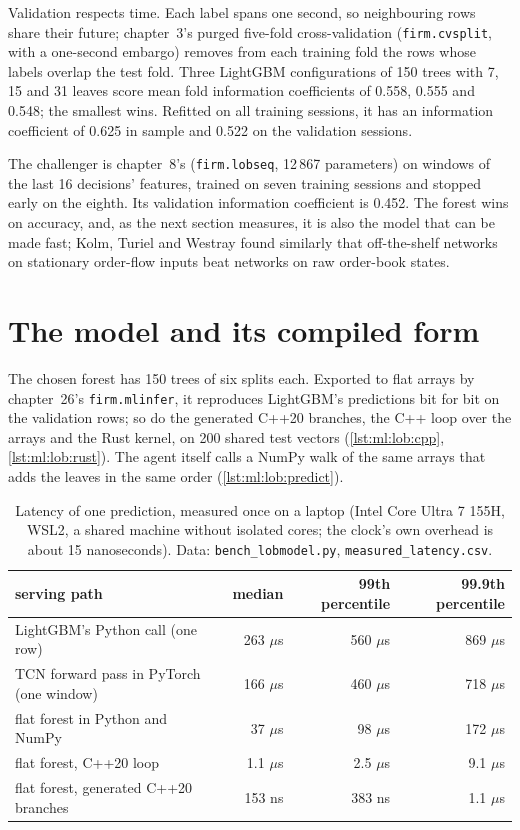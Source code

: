 Validation respects time. Each label spans one second, so neighbouring rows share their future; chapter~3's purged five-fold
cross-validation (\texttt{firm.cvsplit}, with a one-second embargo) removes from each training fold the rows whose labels overlap
the test fold. Three LightGBM configurations of 150 trees with 7, 15 and 31 leaves score mean fold information coefficients of
0.558, 0.555 and 0.548; the smallest wins. Refitted on all training sessions, it has an information coefficient of 0.625 in sample
and 0.522 on the validation sessions.

The challenger is chapter~8's  (\texttt{firm.lobseq}, 12\,867 parameters) on windows of the last 16
decisions' features, trained on seven training sessions and stopped early on the eighth. Its validation information coefficient is
0.452. The forest wins on accuracy, and, as the next section measures, it is also the model that can be made fast; Kolm, Turiel and
Westray found similarly that off-the-shelf networks on stationary order-flow inputs beat networks on raw order-book states.

\section{The model and its compiled form}

The chosen forest has 150 trees of six splits each. Exported to flat arrays by chapter~26's \texttt{firm.mlinfer}, it reproduces
LightGBM's predictions bit for bit on the validation rows; so do the generated C++20 branches, the C++ loop over the arrays and the
Rust kernel, on 200 shared test vectors (\cref{lst:ml:lob:cpp}, \cref{lst:ml:lob:rust}). The agent itself calls a NumPy walk of the
same arrays that adds the leaves in the same order (\cref{lst:ml:lob:predict}).

\begin{table}[htbp]
\centering\small
\begin{tabular}{@{}lrrr@{}}
\toprule
serving path & median & 99th percentile & 99.9th percentile\\
\midrule
LightGBM's Python call (one row) & 263 $\mu$s & 560 $\mu$s & 869 $\mu$s\\
TCN forward pass in PyTorch (one window) & 166 $\mu$s & 460 $\mu$s & 718 $\mu$s\\
flat forest in Python and NumPy & 37 $\mu$s & 98 $\mu$s & 172 $\mu$s\\
flat forest, C++20 loop & 1.1 $\mu$s & 2.5 $\mu$s & 9.1 $\mu$s\\
flat forest, generated C++20 branches & 153 ns & 383 ns & 1.1 $\mu$s\\
\bottomrule
\end{tabular}
\caption{Latency of one prediction, measured once on a laptop (Intel Core Ultra 7 155H, WSL2, a shared machine without isolated
cores; the clock's own overhead is about 15 nanoseconds). Data: \texttt{bench\_lobmodel.py},
\texttt{measured\_latency.csv}.}\label{tab:ml:lob:latency}
\end{table}

